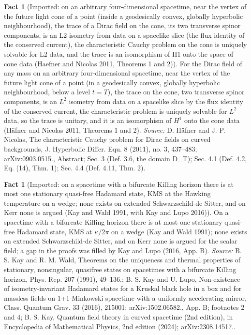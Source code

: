 \documentclass[11pt]{article}
\theoremstyle{definition}
\newtheorem{fact}[theorem]{Fact}
\theoremstyle{plain}
\begin{document}
\begin{fact}[Imported: on an arbitrary four-dimensional spacetime, near the vertex of the future light cone of a point (inside a geodesically convex, globally hyperbolic neighbourhood), the trace of a Dirac field on the cone, its two transverse spinor components, is an L2 isometry from data on a spacelike slice (the flux identity of the conserved current), the characteristic Cauchy problem on the cone is uniquely solvable for L2 data, and the trace is an isomorphism of H1 onto the space of cone data (Haefner and Nicolas 2011, Theorems 1 and 2)]\label{c:synthesis.imported-haefner-nicolas-dirac-characteristic-problem-on-light-cones-near-the-vertex}
For the Dirac field of any mass on an arbitrary four-dimensional spacetime, near the vertex of the future light cone of a point (in a geodesically convex, globally hyperbolic neighbourhood, below a level $t = T$), the trace on the cone, two transverse spinor components, is an $L^{2}$ isometry from data on a spacelike slice by the flux identity of the conserved current, the characteristic problem is uniquely solvable for $L^{2}$ data, so the trace is unitary, and it is an isomorphism of $H^{1}$ onto the cone data (Häfner and Nicolas 2011, Theorems 1 and 2).
\emph{Source:} D. Häfner and J.-P. Nicolas, The characteristic Cauchy problem for Dirac fields on curved backgrounds, J. Hyperbolic Differ. Equ. 8 (2011), no. 3, 437--483; arXiv:0903.0515., Abstract; Sec. 3 (Def. 3.6, the domain D\_T); Sec. 4.1 (Def. 4.2, Eq. (14), Thm. 1); Sec. 4.4 (Def. 4.11, Thm. 2).
\end{fact}

\begin{fact}[Imported: on a spacetime with a bifurcate Killing horizon there is at most one stationary quasi-free Hadamard state, KMS at the Hawking temperature on a wedge; none exists on extended Schwarzschild-de Sitter, and on Kerr none is argued (Kay and Wald 1991, with Kay and Lupo 2016)]\label{c:synthesis.imported-kay-wald-uniqueness-and-no-go}
On a spacetime with a bifurcate Killing horizon there is at most one stationary quasi-free Hadamard state, KMS at $\kappa/2\pi$ on a wedge (Kay and Wald 1991); none exists on extended Schwarzschild-de Sitter, and on Kerr none is argued for the scalar field; a gap in the proofs was filled by Kay and Lupo (2016, App. B).
\emph{Source:} B. S. Kay and R. M. Wald, Theorems on the uniqueness and thermal properties of stationary, nonsingular, quasifree states on spacetimes with a bifurcate Killing horizon, Phys. Rep. 207 (1991), 49--136.; B. S. Kay and U. Lupo, Non-existence of isometry-invariant Hadamard states for a Kruskal black hole in a box and for massless fields on 1+1 Minkowski spacetime with a uniformly accelerating mirror, Class. Quantum Grav. 33 (2016), 215001; arXiv:1502.06582., App. B; footnotes 2 and 4; B. S. Kay, Quantum field theory in curved spacetime (2nd edition), in Encyclopedia of Mathematical Physics, 2nd edition (2024); arXiv:2308.14517..
\end{fact}
\end{document}
